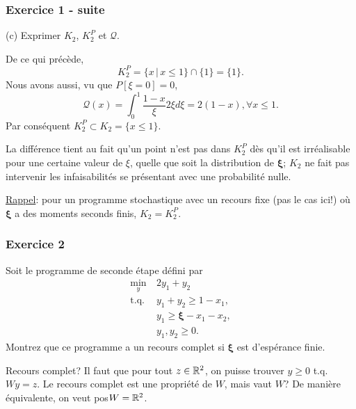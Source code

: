 \documentclass{beamer}
\def\bxi{\boldsymbol\xi}
\begin{document}
\begin{frame}
\frametitle{Exercice 1 - suite}

{\blue (c)} Exprimer $K_2$, $K_2^P$ et $\mathcal{Q}$.

\mbox{}

De ce qui précède,
\[
K_2^P = \lbrace x \,|\, x \leq 1 \rbrace \cap \lbrace 1 \rbrace =
\lbrace 1 \rbrace.
\]
Nous avons aussi, vu que $P[\xi = 0] = 0$,
\[
\mathcal{Q}(x) = \int_0^1 \frac{1-x}{\xi} 2\xi d\xi = 2(1-x), \forall
x \leq 1.
\]
Par conséquent $K_2^P \subset K_2 = \lbrace x \leq 1 \rbrace$.

La différence tient au fait qu'un point n'est
pas dans $K_2^P$ dès qu'il est irréalisable pour une certaine valeur
de $\xi$, quelle que soit la distribution de $\bxi$; $K_2$
ne fait pas intervenir les infaisabilités se présentant avec une
probabilité nulle.

\mbox{}

\underline{Rappel}: pour un programme stochastique avec un recours
fixe (pas le cas ici!) où $\bxi$ a des moments seconds finis, $K_2 =
K_2^P$.

\end{frame}

\begin{frame}
\frametitle{Exercice 2}

Soit le programme de seconde étape défini par
\begin{align*}
\min_y\ & 2y_1+y_2\\
\mbox{t.q. } & y_1 + y_2 \geq 1-x_1,\\
& y_1 \geq \bxi - x_1-x_2,\\
& y_1, y_2 \geq 0.
\end{align*}
Montrez que ce programme a un recours complet si $\bxi$ est
d'espérance finie.

\mbox{}

Recours complet? Il faut que pour tout $z \in \mathbb{R}^{2}$, on puisse
trouver $y \geq 0$
t.q. $Wy = z$. Le recours complet est une propriété de $W$, mais vaut
$W$? De manière équivalente, on veut pos$W = \mathbb{R}^2$.

\end{frame}
\end{document}
